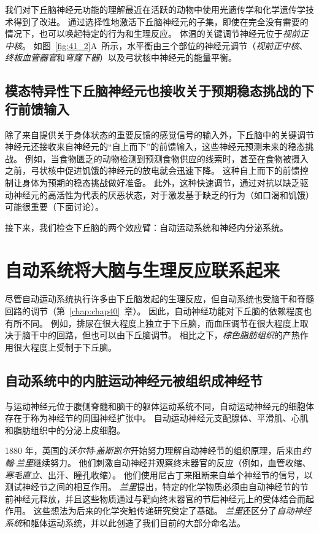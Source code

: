 我们对下丘脑神经元功能的理解最近在活跃的动物中使用光遗传学和化学遗传学技术得到了改进。
通过选择性地激活下丘脑神经元的子集，即使在完全没有需要的情况下，也可以唤起特定的行为和生理反应。
体温的关键调节神经元位于\textit{视前正中核}。
如图~\ref{fig:41_2}A~所示，水平衡由三个部位的神经元调节（\textit{视前正中核}、\textit{终板血管器官}和\textit{穹窿下器}）以及弓状核中神经元的能量平衡。



\subsection{模态特异性下丘脑神经元也接收关于预期稳态挑战的下行前馈输入}

除了来自提供关于身体状态的重要反馈的感觉信号的输入外，下丘脑中的关键调节神经元还接收来自神经元的“自上而下”的前馈输入，这些神经元预测未来的稳态挑战。
例如，当食物匮乏的动物检测到预测食物供应的线索时，甚至在食物被摄入之前，弓状核中促进饥饿的神经元的放电就会迅速下降。
这种自上而下的前馈控制让身体为预期的稳态挑战做好准备。
此外，这种快速调节，通过对抗以缺乏驱动神经元的高活性为代表的厌恶状态，对于激发基于缺乏的行为（如口渴和饥饿）可能很重要（下面讨论）。


接下来，我们检查下丘脑的两个效应臂：自动运动系统和神经内分泌系统。



\section{自动系统将大脑与生理反应联系起来}

尽管自动运动系统执行许多由下丘脑发起的生理反应，但自动系统也受脑干和脊髓回路的调节（第~\ref{chap:chap40}~章）。
因此，自动神经功能对下丘脑的依赖程度也有所不同。
例如，排尿在很大程度上独立于下丘脑，而血压调节在很大程度上取决于脑干中的回路，但也可以由下丘脑调节。
相比之下，\textit{棕色脂肪组织}的产热作用很大程度上受制于下丘脑。



\subsection{自动系统中的内脏运动神经元被组织成神经节}

与运动神经元位于腹侧脊髓和脑干的躯体运动系统不同，自动运动神经元的细胞体存在于称为神经节的周围神经扩张中。
自动运动神经元支配腺体、平滑肌、心肌和脂肪组织中的分泌上皮细胞。


1880 年，英国的\textit{沃尔特$\cdot$盖斯凯尔}开始努力理解自动神经节的组织原理，后来由\textit{约翰$\cdot$兰里}继续努力。
他们刺激自动神经并观察终末器官的反应（例如，血管收缩、\textit{寒毛直立}、出汗、瞳孔收缩）。
他们使用尼古丁来阻断来自单个神经节的信号，以测试神经节之间的相互作用。
\textit{兰里}提出，特定的化学物质必须由自动神经节的节前神经元释放，并且这些物质通过与靶向终末器官的节后神经元上的受体结合而起作用。
这些想法为后来的化学突触传递研究奠定了基础。
\textit{兰里}还区分了\textit{自动神经系统}和躯体运动系统，并以此创造了我们目前的大部分命名法。


